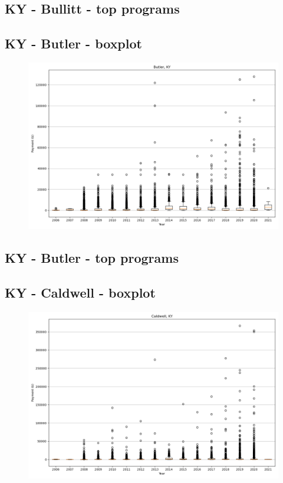 \subsection*{KY - Bullitt - top programs}

\newpage
\subsection*{KY - Butler - boxplot}
\begin{figure}[h]
\centering
\includegraphics[width=7in]{../output/boxplots/counties/Butler-KY_boxplot.png}
\end{figure}


\subsection*{KY - Butler - top programs}

\newpage
\subsection*{KY - Caldwell - boxplot}
\begin{figure}[h]
\centering
\includegraphics[width=7in]{../output/boxplots/counties/Caldwell-KY_boxplot.png}
\end{figure}


